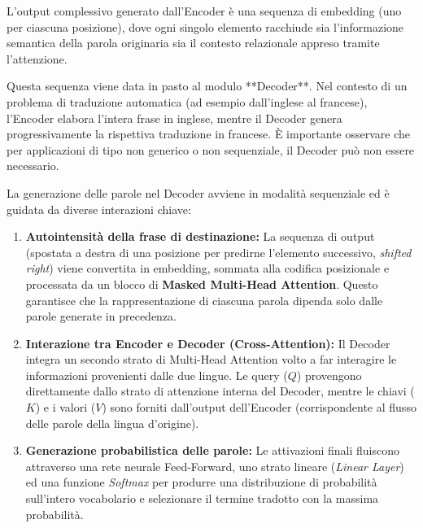 ﻿\documentclass[11pt, a4paper]{article}
\begin{document}
L'output complessivo generato dall'Encoder è una sequenza di embedding (uno per ciascuna posizione), dove ogni singolo elemento racchiude sia l'informazione semantica della parola originaria sia il contesto relazionale appreso tramite l'attenzione.

Questa sequenza viene data in pasto al modulo **Decoder**. Nel contesto di un problema di traduzione automatica (ad esempio dall'inglese al francese), l'Encoder elabora l'intera frase in inglese, mentre il Decoder genera progressivamente la rispettiva traduzione in francese. È importante osservare che per applicazioni di tipo non generico o non sequenziale, il Decoder può non essere necessario.


La generazione delle parole nel Decoder avviene in modalità sequenziale ed è guidata da diverse interazioni chiave:


\begin{enumerate}
    \item \textbf{Autointensità della frase di destinazione:} La sequenza di output (spostata a destra di una posizione per predirne l'elemento successivo, \emph{shifted right}) viene convertita in embedding, sommata alla codifica posizionale e processata da un blocco di \textbf{Masked Multi-Head Attention}. Questo garantisce che la rappresentazione di ciascuna parola dipenda solo dalle parole generate in precedenza.
    \item \textbf{Interazione tra Encoder e Decoder (Cross-Attention):} Il Decoder integra un secondo strato di Multi-Head Attention volto a far interagire le informazioni provenienti dalle due lingue. Le query ($Q$) provengono direttamente dallo strato di attenzione interna del Decoder, mentre le chiavi ($K$) e i valori ($V$) sono forniti dall'output dell'Encoder (corrispondente al flusso delle parole della lingua d'origine).
    \item \textbf{Generazione probabilistica delle parole:} Le attivazioni finali fluiscono attraverso una rete neurale Feed-Forward, uno strato lineare (\emph{Linear Layer}) ed una funzione \emph{Softmax} per produrre una distribuzione di probabilità sull'intero vocabolario e selezionare il termine tradotto con la massima probabilità.
\end{enumerate}
\end{document}
